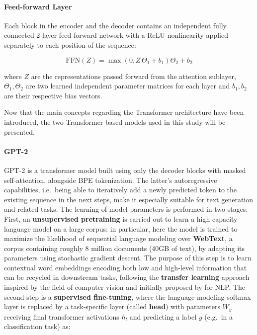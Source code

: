 \documentclass[a4paper, nobind]{templates/ociamthesis}
\begin{document}
\paragraph{Feed-forward Layer} Each block in the encoder and the decoder contains an independent fully connected 2-layer feed-forward network with a ReLU nonlinearity applied separately to each position of the sequence:

\begin{equation}
\text{FFN}(Z) = \max(0,Z\,\Theta_1 + b_1)\Theta_2 + b_2
\end{equation}

where \(Z\) are the representations passed forward from the attention sublayer, \(\Theta_1, \Theta_2\) are two learned independent parameter matrices for each layer and \(b_1, b_2\) are their respective bias vectors.

Now that the main concepts regarding the Transformer architecture have been introduced, the two Transformer-based models used in this study will be presented.

\paragraph{GPT-2} GPT-2 \autocite{radford-etal-2019-language} is a transformer model built using only the decoder blocks with masked self-attention, alongside BPE tokenization. The latter's autoregressive capabilities, i.e.~being able to iteratively add a newly predicted token to the existing sequence in the next steps, make it especially suitable for text generation and related tasks. The learning of model parameters is performed in two stages. First, an \textbf{unsupervised pretraining} is carried out to learn a high capacity language model on a large corpus: in particular, here the model is trained to maximize the likelihood of sequential language modeling over \textbf{WebText}, a corpus containing roughly 8 million documents (40GB of text), by adapting its parameters using stochastic gradient descent. The purpose of this step is to learn contextual word embeddings encoding both low and high-level information that can be recycled in downstream tasks, following the \textbf{transfer learning} approach inspired by the field of computer vision and initially proposed by \textcite{howard-ruder-2018-universal} for NLP. The second step is a \textbf{supervised fine-tuning}, where the language modeling softmax layer is replaced by a task-specific layer (called \textbf{head}) with parameters \(W_y\) receiving final transformer activations \(h_l\) and predicting a label \(y\) (e.g.~in a classification task) as:
\end{document}
